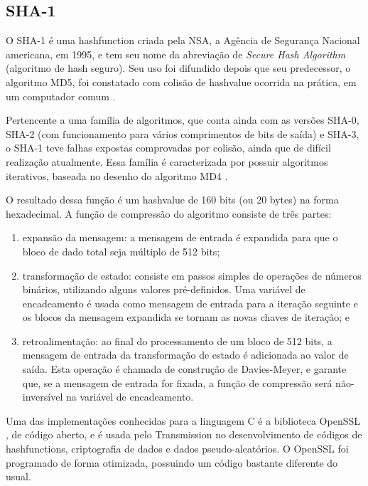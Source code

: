 
\subsection*{SHA-1}

O SHA-1 é uma \gls*{hashfunction} criada pela NSA, a Agência de Segurança Nacional
americana, em 1995, e tem seu nome da abreviação de \emph{Secure Hash Algorithm}
(algoritmo de hash seguro). Seu uso foi difundido depois que seu predecessor, o
algoritmo MD5, foi constatado com colisão de \gls*{hashvalue} ocorrida na prática,
em um computador comum \cite{report:md5-attack}.

Pertencente a uma família de algoritmos, que conta ainda com as versões SHA-0, SHA-2
(com funcionamento para vários comprimentos de bits de saída) e SHA-3, o SHA-1 teve
falhas expostas comprovadas por colisão, ainda que de difícil realização atualmente.
Essa família é caracterizada por possuir algoritmos iterativos, baseada no desenho do
algoritmo MD4 \cite{report:md4}.

O resultado dessa função é um \gls*{hashvalue} de 160 bits (ou 20 bytes) na forma
hexadecimal. A função de compressão do algoritmo consiste de três partes:

\begin{enumerate}
    \item expansão da mensagem: a mensagem de entrada é expandida para que o bloco de
        dado total seja múltiplo de 512 bits;

    \item transformação de estado: consiste em passos simples de operações de números
        binários, utilizando alguns valores pré-definidos. Uma variável de encadeamento
        é usada como mensagem de entrada para a iteração seguinte e os blocos da
        mensagem expandida se tornam as novas chaves de iteração; e

    \item retroalimentação: ao final do processamento de um bloco de 512 bits, a
        mensagem de entrada da transformação de estado é adicionada ao valor de saída.
        Esta operação é chamada de construção de Davies-Meyer, e garante que, se a
        mensagem de entrada for fixada, a função de compressão será não-inversível na
        variável de encadeamento.
\end{enumerate}

Uma das implementações conhecidas para a linguagem C é a biblioteca OpenSSL
\cite{site:openssl}, de código aberto, e é usada pelo Transmission no desenvolvimento de
códigos de \glspl*{hashfunction}, criptografia de dados e dados pseudo-aleatórios. O
OpenSSL foi programado de forma otimizada, possuindo um código bastante diferente do
usual.

